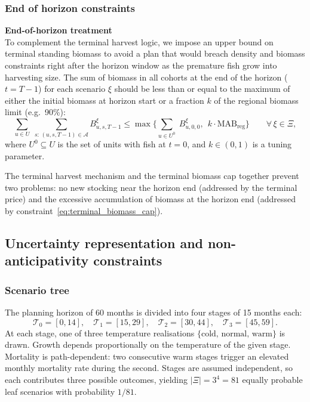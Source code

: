 \documentclass[12pt,a4paper]{article}
\begin{document}
\subsubsection{End of horizon constraints}
\noindent \textbf{End-of-horizon treatment} \\
To complement the terminal harvest logic, we impose an upper bound on terminal standing biomass to avoid a plan that would breach density and biomass constraints right after the horizon window as the premature fish grow into harvesting size. The sum of biomass in all cohorts at the end of the horizon ($t = T - 1$) for each scenario $\xi$ should be less than or equal to the maximum of either the initial biomass at horizon start or a fraction $k$ of the regional biomass limit (e.g.\ 90\%):
\begin{equation}
\sum_{u \in U}\;\sum_{s:\,(u,s,T{-}1)\in\mathcal{A}} B^\xi_{u,s,T-1}
    \leq \max \Big\{\sum_{u \in U^0}\;B^\xi_{u,0,0}, \ \  k \cdot \mathrm{MAB}_{\mathrm{reg}}\Big\}
    \qquad \forall\, \xi \in \Xi,
  \label{eq:terminal_biomass_cap}
\end{equation}
where $U^{0} \subseteq U$ is the set of units with fish at $t=0$, and $k \in (0,1)$ is a tuning parameter.
 
The terminal harvest mechanism and the terminal biomass cap together prevent two problems: no new stocking near the horizon end (addressed by the terminal price) and the excessive accumulation of biomass at the horizon end (addressed by constraint~\eqref{eq:terminal_biomass_cap}).
 
 
\subsection{Uncertainty representation and non-anticipativity constraints}
\label{sec:uncertainty}
 
\subsubsection{Scenario tree}
The planning horizon of 60 months is divided into four stages of 15 months each:
\begin{equation*}
  \mathcal{T}_0 = [0,14],\quad
  \mathcal{T}_1 = [15,29],\quad
  \mathcal{T}_2 = [30,44],\quad
  \mathcal{T}_3 = [45,59].
\end{equation*}
At each stage, one of three temperature realisations $\{\text{cold, normal, warm}\}$ is drawn. Growth depends proportionally on the temperature of the given stage. Mortality is path-dependent: two consecutive warm stages trigger an elevated monthly mortality rate during the second. Stages are assumed independent, so each contributes three possible outcomes, yielding $|\Xi| = 3^4 = 81$ equally probable leaf scenarios with probability $1/81$.
 
\end{document}
